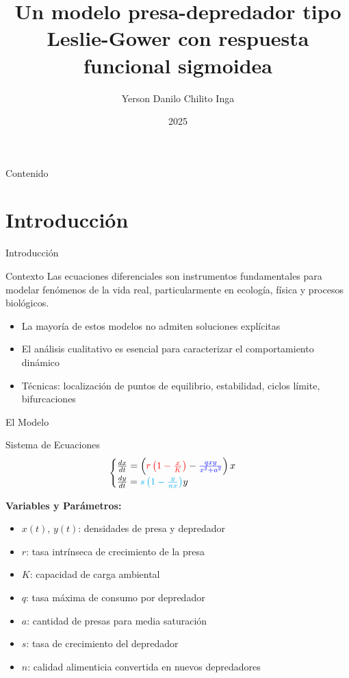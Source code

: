 \documentclass[aspectratio=169]{beamer}
\title[Modelo Leslie-Gower con respuesta sigmoidea]{Un modelo presa-depredador tipo Leslie-Gower con respuesta funcional sigmoidea}
\author[Yerson Chilito]{Yerson Danilo Chilito Inga}
\institute[U. del Cauca]{
	Universidad del Cauca \\
	Departamento de Matemáticas \\
	\vspace{0.3cm}
	Director: Dr. Jhon Jairo Pérez
}
\date{2025}
\theoremstyle{definition}
\begin{document}
	
	\begin{frame}
		\titlepage
	\end{frame}
	
	\begin{frame}{Contenido}
		\tableofcontents
	\end{frame}
	
	\section{Introducción}
	
	\begin{frame}{Introducción}
		\begin{block}{Contexto}
			Las ecuaciones diferenciales son instrumentos fundamentales para modelar fenómenos de la vida real, particularmente en ecología, física y procesos biológicos.
		\end{block}
		
		\vspace{0.5cm}
		
		\begin{itemize}
			\item La mayoría de estos modelos no admiten soluciones explícitas
			\item El análisis cualitativo es esencial para caracterizar el comportamiento dinámico
			\item Técnicas: localización de puntos de equilibrio, estabilidad, ciclos límite, bifurcaciones
		\end{itemize}
	\end{frame}
	
	\begin{frame}{El Modelo}
		\begin{block}{Sistema de Ecuaciones}
			\begin{equation*}
				\begin{cases} 
					\frac{dx}{dt} = \left({\color{red} r \left(1 - \frac{x}{K}\right)} - {\color{blue}\frac{q x y}{x^2 + a^2}} \right)x \\ 
					\frac{dy}{dt} = {\color{cyan} s \left(1 - \frac{y}{n x}\right)} y
				\end{cases}
			\end{equation*}
		\end{block}
		
		\textbf{Variables y Parámetros:}
		\begin{itemize}
			\item $x(t)$, $y(t)$: densidades de presa y depredador
			\item $r$: tasa intrínseca de crecimiento de la presa
			\item $K$: capacidad de carga ambiental
			\item $q$: tasa máxima de consumo por depredador
			\item $a$: cantidad de presas para media saturación
			\item $s$: tasa de crecimiento del depredador
			\item $n$: calidad alimenticia convertida en nuevos depredadores
		\end{itemize}
	\end{frame}
	
\end{document}
